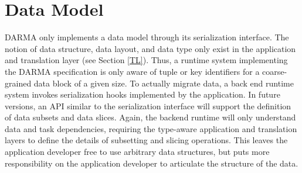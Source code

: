 
\section{Data Model}
\label{sec:data_model}
\gls{DARMA} only implements a \gls{data model} through its \gls{serialization} interface.
The notion of data structure, data layout, and data type only exist in the
application and \gls{translation layer} (see Section \ref{TL}).
Thus, a \gls{runtime system} implementing the \gls{DARMA} specification is only
aware of \gls{tuple} or \gls{key} identifiers for a coarse-grained data block of a given size.
To actually migrate data, a \gls{back end} \gls{runtime system} invokes
\gls{serialization} hooks implemented by the application.
In future versions, an \gls{API} similar to the \gls{serialization} interface will support the definition of data subsets and data slices.
Again, the backend runtime will only understand data and task dependencies,
  requiring the type-aware application and \glspl{translation layer} to define
  the details of subsetting and slicing operations.
This leaves the application developer free to use arbitrary data structures,
     but puts more responsibility on the application developer to articulate
     the structure of the data.


